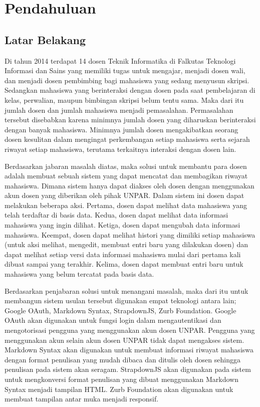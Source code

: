 \chapter{Pendahuluan}
\label{chap:pendahuluan}

\section{Latar Belakang}
\label{sec:latarbelakang}

Di tahun 2014 terdapat 14 dosen Teknik Informatika di Falkutas Teknologi Informasi dan Sains \cite{Ftis:2014} yang memiliki tugas untuk mengajar, menjadi dosen wali, dan menjadi dosen pembimbing bagi mahasiswa yang sedang menyusun skripsi. Sedangkan mahasiswa yang berinteraksi dengan dosen pada saat pembelajaran di kelas, perwalian, maupun bimbingan skripsi belum tentu sama. Maka dari itu jumlah dosen dan jumlah mahasiswa menjadi pemasalahan. Permasalahan tersebut disebabkan karena minimnya jumlah dosen yang diharuskan berinteraksi dengan banyak mahasiswa. Minimnya jumlah dosen mengakibatkan seorang dosen kesulitan dalam mengingat perkembangan setiap mahasiswa serta sejarah riwayat setiap mahasiswa, terutama terkaitnya interaksi dengan dosen lain.

Berdasarkan jabaran masalah diatas, maka solusi untuk membantu para dosen adalah membuat sebuah sistem yang dapat mencatat dan membagikan riwayat mahasiswa. Dimana sistem hanya dapat diakses oleh dosen dengan menggunakan akun dosen yang diberikan oleh pihak UNPAR. Dalam sistem ini dosen dapat melakukan beberapa aksi. Pertama, dosen dapat melihat data mahasiswa yang telah terdaftar di basis data. Kedua, dosen dapat melihat data informasi mahasiswa yang ingin dilihat. Ketiga, dosen dapat mengubah data informasi mahasiswa. Keempat, dosen dapat melihat histori yang dimiliki setiap mahasiswa (untuk aksi melihat, mengedit, membuat entri baru yang dilakukan dosen) dan dapat melihat setiap versi data informasi mahasiswa mulai dari pertama kali dibuat sampai yang terakhir. Kelima, dosen dapat membuat entri baru untuk mahasiswa yang belum tercatat pada basis data. 

Berdasarkan penjabaran solusi untuk menangani masalah, maka dari itu untuk membangun sistem usulan tersebut digunakan empat teknologi antara lain; Google OAuth, Markdown Syntax, StrapdownJS, Zurb Foundation. Google OAuth akan digunakan untuk fungsi login dalam mengautentikasi dan mengotorisasi pengguna yang menggunakan akun dosen UNPAR. Pengguna yang menggunakan akun selain akun dosen UNPAR tidak dapat mengakses sistem. Markdown Syntax akan digunakan untuk membuat informasi riwayat mahasiswa dengan format penulisan yang mudah dibaca dan ditulis oleh dosen sehingga penulisan pada sistem akan seragam. StrapdownJS akan digunakan pada sistem untuk mengkonversi format penulisan yang dibuat menggunakan Markdown Syntax menjadi tampilan HTML. Zurb Foundation akan digunakan untuk membuat tampilan antar muka menjadi responsif.

